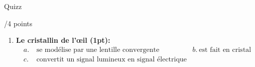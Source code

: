 \begin{doc}{Quizz \begin{Large}
    /4 points
\end{Large}}
\begin{enumerate}
\begin{align*}
            a.& ~\text{plus petit que 1} & b.& ~\text{plus grand que 1} & c.& ~\text{égal à 1 dans le plexiglas} 
        \end{align*}
    \item \textbf{Le cristallin de l'\oe il (1pt):}
    \begin{align*}
            a.& ~\text{se modélise par une lentille convergente} & b.~\text{est fait en cristal} \\
            c.& ~\text{convertit un signal lumineux en signal électrique} 
        \end{align*}
\end{enumerate}
\end{doc}

